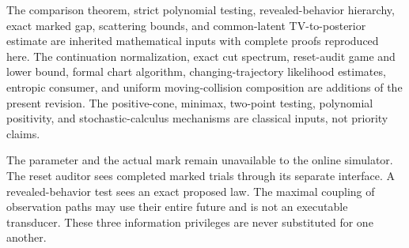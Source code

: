 The comparison theorem, strict polynomial testing, revealed-behavior
hierarchy, exact marked gap, scattering bounds, and common-latent
TV-to-posterior estimate are inherited mathematical inputs with complete
proofs reproduced here. The continuation normalization, exact cut spectrum,
reset-audit game and lower bound, formal chart algorithm, changing-trajectory
likelihood estimates, entropic consumer, and uniform moving-collision
composition are additions of the present revision. The positive-cone,
minimax, two-point testing, polynomial positivity, and stochastic-calculus
mechanisms are classical inputs, not priority claims.

The parameter and the actual mark remain unavailable to the online
simulator. The reset auditor sees completed marked trials through its
separate interface. A revealed-behavior test sees an exact proposed law.
The maximal coupling of observation paths may use their entire future and
is not an executable transducer. These three information privileges are
never substituted for one another.
